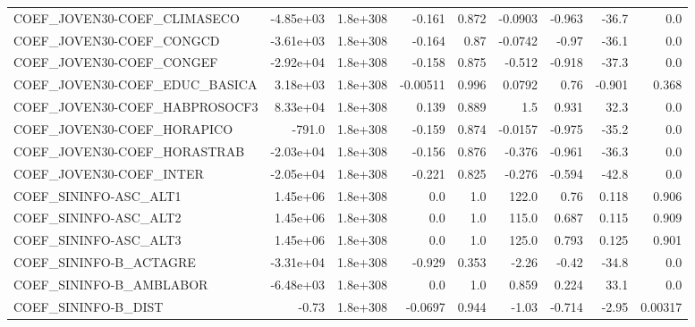 \begin{tabular}{lrrrrrrrr}
COEF\_JOVEN30-COEF\_CLIMASECO       &   -4.85e+03 &     1.8e+308 &   -0.161 &    0.872 &    -0.0903 &      -0.963 &        -36.7 &           0.0 \\
COEF\_JOVEN30-COEF\_CONGCD          &   -3.61e+03 &     1.8e+308 &   -0.164 &     0.87 &    -0.0742 &       -0.97 &        -36.1 &           0.0 \\
COEF\_JOVEN30-COEF\_CONGEF          &   -2.92e+04 &     1.8e+308 &   -0.158 &    0.875 &     -0.512 &      -0.918 &        -37.3 &           0.0 \\
COEF\_JOVEN30-COEF\_EDUC\_BASICA     &    3.18e+03 &     1.8e+308 & -0.00511 &    0.996 &     0.0792 &        0.76 &       -0.901 &         0.368 \\
COEF\_JOVEN30-COEF\_HABPROSOCF3     &    8.33e+04 &     1.8e+308 &    0.139 &    0.889 &        1.5 &       0.931 &         32.3 &           0.0 \\
COEF\_JOVEN30-COEF\_HORAPICO        &      -791.0 &     1.8e+308 &   -0.159 &    0.874 &    -0.0157 &      -0.975 &        -35.2 &           0.0 \\
COEF\_JOVEN30-COEF\_HORASTRAB       &   -2.03e+04 &     1.8e+308 &   -0.156 &    0.876 &     -0.376 &      -0.961 &        -36.3 &           0.0 \\
COEF\_JOVEN30-COEF\_INTER           &   -2.05e+04 &     1.8e+308 &   -0.221 &    0.825 &     -0.276 &      -0.594 &        -42.8 &           0.0 \\
COEF\_SININFO-ASC\_ALT1             &    1.45e+06 &     1.8e+308 &      0.0 &      1.0 &      122.0 &        0.76 &        0.118 &         0.906 \\
COEF\_SININFO-ASC\_ALT2             &    1.45e+06 &     1.8e+308 &      0.0 &      1.0 &      115.0 &       0.687 &        0.115 &         0.909 \\
COEF\_SININFO-ASC\_ALT3             &    1.45e+06 &     1.8e+308 &      0.0 &      1.0 &      125.0 &       0.793 &        0.125 &         0.901 \\
COEF\_SININFO-B\_ACTAGRE            &   -3.31e+04 &     1.8e+308 &   -0.929 &    0.353 &      -2.26 &       -0.42 &        -34.8 &           0.0 \\
COEF\_SININFO-B\_AMBLABOR           &   -6.48e+03 &     1.8e+308 &      0.0 &      1.0 &      0.859 &       0.224 &         33.1 &           0.0 \\
COEF\_SININFO-B\_DIST               &       -0.73 &     1.8e+308 &  -0.0697 &    0.944 &      -1.03 &      -0.714 &        -2.95 &       0.00317 \\

\end{tabular}

